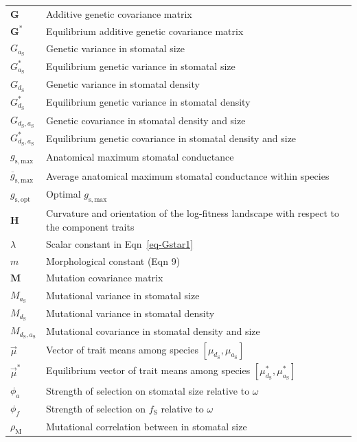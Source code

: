 \documentclass[
  letterpaper,
  DIV=11,
  numbers=noendperiod]{scrartcl}
\begin{document}
\begin{longtable}[]{@{}
  >{\raggedright\arraybackslash}p{}
  >{\raggedright\arraybackslash}p{}@{}}
\(\mathbf{G}\) & Additive genetic covariance matrix \\
\(\mathbf{G}^*\) & Equilibrium additive genetic covariance matrix \\
\(G_{a_\mathrm{S}}\) & Genetic variance in stomatal size \\
\(G^*_{a_\mathrm{S}}\) & Equilibrium genetic variance in stomatal
size \\
\(G_{d_\mathrm{S}}\) & Genetic variance in stomatal density \\
\(G^*_{d_\mathrm{S}}\) & Equilibrium genetic variance in stomatal
density \\
\(G_{d_\mathrm{S},a_\mathrm{S}}\) & Genetic covariance in stomatal
density and size \\
\(G^*_{d_\mathrm{S},a_\mathrm{S}}\) & Equilibrium genetic covariance in
stomatal density and size \\
\(g_\mathrm{s,max}\) & Anatomical maximum stomatal conductance \\
\(\overline{g}_\mathrm{s,max}\) & Average anatomical maximum stomatal
conductance within species \\
\(g_\mathrm{s,opt}\) & Optimal \(g_\mathrm{s,max}\) \\
\(\mathbf{H}\) & Curvature and orientation of the log-fitness landscape
with respect to the component traits \\
\(\lambda\) & Scalar constant in Eqn~\ref{eq-Gstar1} \\
\(m\) & Morphological constant (Eqn 9) \\
\(\mathbf{M}\) & Mutation covariance matrix \\
\(M_{a_\mathrm{S}}\) & Mutational variance in stomatal size \\
\(M_{d_\mathrm{S}}\) & Mutational variance in stomatal density \\
\(M_{d_\mathrm{S},a_\mathrm{S}}\) & Mutational covariance in stomatal
density and size \\
\(\vec{\mu}\) & Vector of trait means among species
\([\mu_{d_\mathrm{S}}, \mu_{a_\mathrm{S}}]\) \\
\(\vec{\mu}^*\) & Equilibrium vector of trait means among species
\([\mu_{d_\mathrm{S}}^*, \mu_{a_\mathrm{S}}^*]\) \\
\(\phi_a\) & Strength of selection on stomatal size relative to
\(\omega\) \\
\(\phi_f\) & Strength of selection on \(f_\mathrm{S}\) relative to
\(\omega\) \\
\(\rho_\mathrm{M}\) & Mutational correlation between in stomatal size

\end{longtable}
\end{document}
